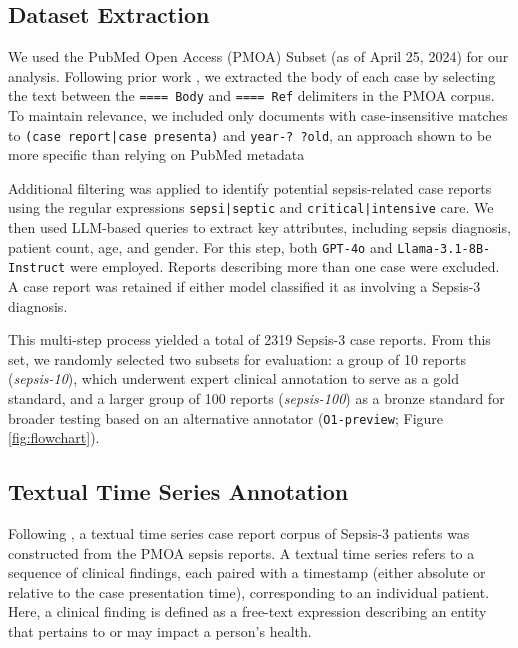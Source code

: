 \documentclass[letterpaper]{article} %
\begin{document}
\subsection{Dataset Extraction}
We used the PubMed Open Access (PMOA) Subset (as of April 25, 2024) for our analysis. Following prior work \cite{wang2025large}, we extracted the body of each case by selecting the text between the \texttt{==== Body} and \texttt{==== Ref} delimiters in the PMOA corpus. To maintain relevance, we included only documents with case-insensitive matches to \texttt{(case report|case presenta)} and \texttt{year-? ?old}, an approach shown to be more specific than relying on PubMed metadata 


Additional filtering was applied to identify potential sepsis-related case reports using the regular expressions \texttt{sepsi|\allowbreak septic} and \texttt{critical|intensive} care. We then used LLM-based queries to extract key attributes, including sepsis diagnosis, patient count, age, and gender. For this step, both \texttt{GPT-4o} and \texttt{Llama-3.1-8B-Instruct} were employed. Reports describing more than one case were excluded. A case report was retained if either model classified it as involving a Sepsis-3 diagnosis.

This multi-step process yielded a total of 2319 Sepsis-3 case reports. From this set, we randomly selected two subsets for evaluation: a group of 10 reports (\textit{sepsis-10}), which underwent expert clinical annotation to serve as a gold standard, and a larger group of 100 reports (\textit{sepsis-100}) as a bronze standard for broader testing based on an alternative annotator (\texttt{O1-preview}; Figure \ref{fig:flowchart}). %

\subsection{Textual Time Series Annotation}
\label{sec:tts-annotation}

Following \citeauthor{noroozizadeh2025reconstructing} \citeyearpar{noroozizadeh2025reconstructing}, a textual time series case report corpus of Sepsis-3 patients was constructed from the PMOA sepsis reports. A textual time series refers to a sequence of clinical findings, each paired with a timestamp (either absolute or relative to the case presentation time), corresponding to an individual patient. Here, a clinical finding is defined as a free-text expression describing an entity that pertains to or may impact a person's health.
\end{document}
